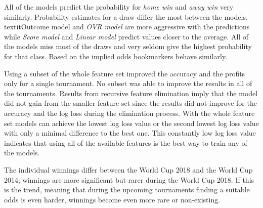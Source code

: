 All of the models predict the probability for \textit{home win} and \textit{away win} very similarly. Probability estimates for a draw differ the most between the models. textit{Outcome model} and \textit{OVR model} are more aggressive with the predictions while \textit{Score model} and \textit{Linear model} predict values closer to the average. All of the models miss most of the draws and very seldom give the highest probability for that class. Based on the implied odds bookmarkers behave similarly.

Using a subset of the whole feature set improved the accuracy and the profits only for a single tournament. No subset was able to improve the results in all of the tournaments. Results from recursive feature elimination imply that the model did not gain from the smaller feature set since the results did not improve for the accuracy and the log loss during the elimination process. With the whole feature set models can achieve the lowest log loss value or the second lowest log loss value with only a minimal difference to the best one. This constantly low log loss value indicates that using all of the available features is the best way to train any of the models.

The individual winnings differ between the World Cup 2018 and the World Cup 2014; winnings are more significant but rarer during the World Cup 2018. If this is the trend, meaning that during the upcoming tournaments finding a suitable odds is even harder, winnings become even more rare or non-existing.
